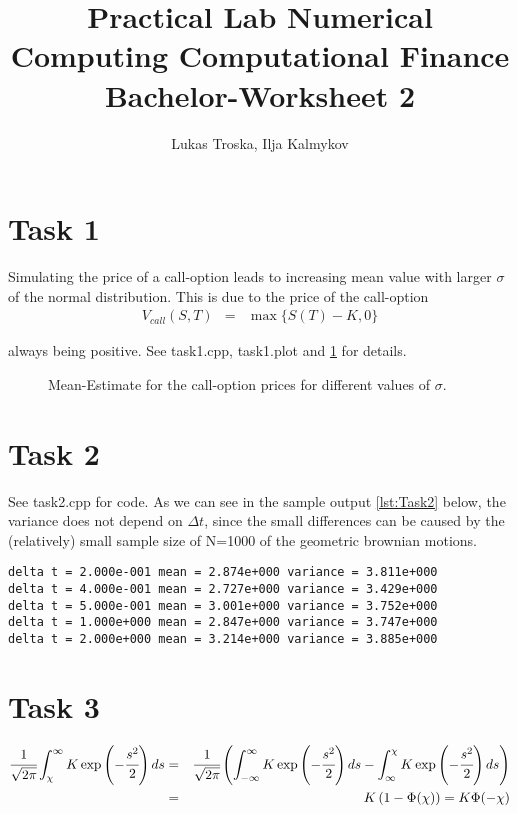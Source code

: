 \documentclass[]{article}
\title{Practical Lab Numerical Computing Computational Finance \\Bachelor-Worksheet 2}
\author{Lukas Troska, Ilja Kalmykov}
\date{}
\begin{document}
\maketitle \section*{Task 1} Simulating the price of a call-option leads to
increasing mean value with larger $\sigma$ of the normal distribution. This is
due to the price of the call-option
\begin{eqnarray*}
V_{call}\left(S,T\right) & = &\max \lbrace S(T)-K,0 \rbrace
\end{eqnarray*}

always being positive. See task1.cpp,
task1.plot and \cref{fig:Task1} for details.
\begin{figure}[!ht]

\caption{Mean-Estimate for the call-option prices for different values of
$\sigma$.}
\label{fig:Task1}
\end{figure}


\section*{Task 2} See task2.cpp for code. As we can see in the sample output
\cref{lst:Task2} below, the variance does not depend on $\Delta t$, since the
small differences can be caused by the (relatively) small sample size of N=1000
of the geometric brownian motions.
\begin{lstlisting}[caption = estimated $\mu$ and $\sigma$ for
different values of $\Delta t$ and N = 1.0E3, captionpos=b, label=lst:Task2] 
delta t = 2.000e-001 mean = 2.874e+000 variance = 3.811e+000
delta t = 4.000e-001 mean = 2.727e+000 variance = 3.429e+000
delta t = 5.000e-001 mean = 3.001e+000 variance = 3.752e+000
delta t = 1.000e+000 mean = 2.847e+000 variance = 3.747e+000
delta t = 2.000e+000 mean = 3.214e+000 variance = 3.885e+000
\end{lstlisting}

\section*{Task 3}
\begin{eqnarray*}
\cfrac{1}{\sqrt{2\pi}}\int_{\chi}^{\infty}K\exp\left(-\cfrac{s^2}{2}\right)ds &
= & \cfrac{1}{\sqrt{2\pi}}\left(\int_{-\infty}^{\infty}K\exp\left(-\cfrac{s^2}{2}\right)ds
- \int_{\infty}^{\chi}K\exp\left(-\cfrac{s^2}{2}\right)ds \right) \\
& = & K\left(1 - \Phi(\chi)\right) = K \Phi(-\chi)
\end{eqnarray*}
\end{document}
